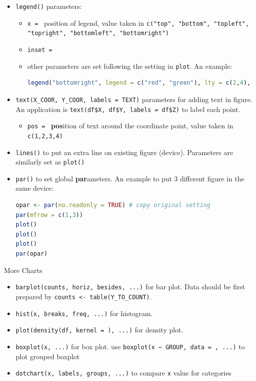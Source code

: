 \begin{itemize}[topsep=2pt,itemsep=0pt]
    \item \lstinline|legend()| parameters:
    \begin{itemize}[topsep=2pt,itemsep=0pt]
        \item \lstinline|x = | position of legend, value taken in \lstinline|c("top", "bottom", "topleft", "topright", "bottomleft", "bottomright")|
        \item \lstinline|inset = |
        \item other parameters are set following the setting in \lstinline|plot|. An example:
\begin{lstlisting}[language=R]
legend("bottomright", legend = c("red", "green"), lty = c(2,4), lwd = 3, col = c("red", "green"))
\end{lstlisting}

    \end{itemize}

    \item \lstinline|text(X_COOR, Y_COOR, labels = TEXT)| parameters for adding text in figure. An application is \lstinline|text(df$X, df$Y, labels = df$Z)| to label each point.
    \begin{itemize}[topsep=2pt,itemsep=0pt]
        \item \lstinline|pos = | \textbf{pos}ition of text around the coordinate point, value taken in \lstinline|c(1,2,3,4)| 
    \end{itemize}
    
    \item \lstinline|lines()| to put an extra line on existing figure (device). Parameters are similarly set as \lstinline|plot()|
    
    \item \lstinline|par()| to set global \textbf{par}ameters. An example to put 3 different figure in the same device:
\begin{lstlisting}[language=R]
opar <- par(no.readonly = TRUE) # copy original setting
par(mfrow = c(1,3))
plot()
plot()
plot()
par(opar)
\end{lstlisting}

\end{itemize}

\begin{point}
    More Charts
\end{point}

\begin{itemize}[topsep=2pt,itemsep=0pt]
    \item \lstinline|barplot(counts, horiz, besides, ...)| for bar plot. Data should be first prepared by \lstinline|counts <- table(Y_TO_COUNT)|. 
    \item \lstinline|hist(x, breaks, freq, ...)| for histogram.
    \item \lstinline|plot(density(df, kernel = ), ...)| for density plot.
    \item \lstinline|boxplot(x, ...)| for box plot. use \lstinline|boxplot(x ~ GROUP, data = , ...)| to plot grouped boxplot
    \item \lstinline|dotchart(x, labels, groups, ...)| to compare \lstinline|x| value for categories
\end{itemize}


